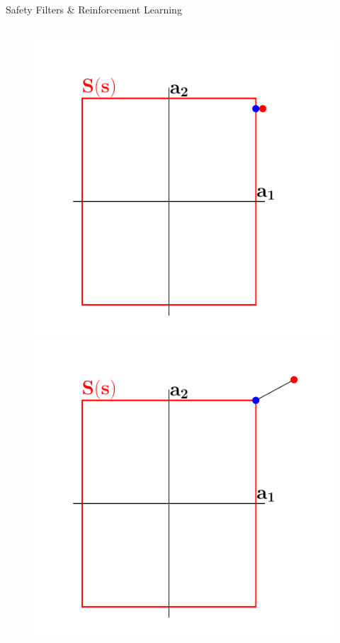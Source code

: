 \documentclass[lecture]{beamer}
\begin{document}
\begin{frame}{\normalsize Safety Filters \& Reinforcement Learning}
\begin{columns}[t]
\begin{overlayarea}{\textwidth}{.5\textheight}
\begin{figure}
{	}
	      \only<10>
        {
        \center
	\includegraphics[width=1\textwidth,clip]{Codes/SafetyFilters/Projection7.pdf}
	}
	      \only<11>
        {
        \center
	\includegraphics[width=1\textwidth,clip]{Codes/SafetyFilters/Projection8.pdf}
}
\end{figure}
\end{overlayarea}
\end{columns}
\end{frame}
\end{document}
